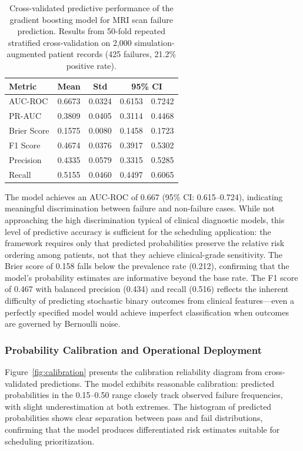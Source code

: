 \documentclass[11pt,a4paper]{article}
\begin{document}
\begin{table}[H]
\centering
\caption{Cross-validated predictive performance of the gradient boosting model for MRI scan failure prediction. Results from 50-fold repeated stratified cross-validation on 2,000 simulation-augmented patient records (425 failures, 21.2\% positive rate).}
\label{tab:ml_cv_metrics}
\begin{tabular}{lcccc}
\toprule
Metric & Mean & Std & \multicolumn{2}{c}{95\% CI} \\
\midrule
AUC-ROC & 0.6673 & 0.0324 & 0.6153 & 0.7242 \\
PR-AUC & 0.3809 & 0.0405 & 0.3114 & 0.4468 \\
Brier Score & 0.1575 & 0.0080 & 0.1458 & 0.1723 \\
F1 Score & 0.4674 & 0.0376 & 0.3917 & 0.5302 \\
Precision & 0.4335 & 0.0579 & 0.3315 & 0.5285 \\
Recall & 0.5155 & 0.0460 & 0.4497 & 0.6065 \\
\bottomrule
\end{tabular}
\end{table}

The model achieves an AUC-ROC of 0.667 (95\% CI: 0.615--0.724), indicating meaningful discrimination between failure and non-failure cases. While not approaching the high discrimination typical of clinical diagnostic models, this level of predictive accuracy is sufficient for the scheduling application: the framework requires only that predicted probabilities preserve the relative risk ordering among patients, not that they achieve clinical-grade sensitivity. The Brier score of 0.158 falls below the prevalence rate (0.212), confirming that the model's probability estimates are informative beyond the base rate. The F1 score of 0.467 with balanced precision (0.434) and recall (0.516) reflects the inherent difficulty of predicting stochastic binary outcomes from clinical features---even a perfectly specified model would achieve imperfect classification when outcomes are governed by Bernoulli noise.

\subsubsection{Probability Calibration and Operational Deployment}

Figure~\ref{fig:calibration} presents the calibration reliability diagram from cross-validated predictions. The model exhibits reasonable calibration: predicted probabilities in the 0.15--0.50 range closely track observed failure frequencies, with slight underestimation at both extremes. The histogram of predicted probabilities shows clear separation between pass and fail distributions, confirming that the model produces differentiated risk estimates suitable for scheduling prioritization.
\end{document}
